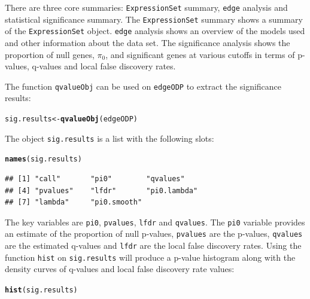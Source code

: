 \documentclass{article}\usepackage[]{graphicx}\usepackage[]{color}
\makeatletter
\newcommand{\hlstd}[1]{\textcolor[rgb]{0.345,0.345,0.345}{#1}}%
\newcommand{\hlkwb}[1]{\textcolor[rgb]{0.69,0.353,0.396}{#1}}%
\newcommand{\hlkwd}[1]{\textcolor[rgb]{0.737,0.353,0.396}{\textbf{#1}}}%
\newenvironment{kframe}{%
 \def\at@end@of@kframe{}%
 \ifinner\ifhmode%
  \def\at@end@of@kframe{\end{minipage}}%
  \begin{minipage}{\columnwidth}%
 \fi\fi%
 \def\FrameCommand##1{\hskip\@totalleftmargin \hskip-\fboxsep
 \colorbox{shadecolor}{##1}\hskip-\fboxsep
     \hskip-\linewidth \hskip-\@totalleftmargin \hskip\columnwidth}%
 \MakeFramed {\advance\hsize-\width
   \@totalleftmargin\z@ \linewidth\hsize
   \@setminipage}}%
 {\par\unskip\endMakeFramed%
 \at@end@of@kframe}
\newenvironment{knitrout}{}{} %
\makeatother
\begin{document}
There are three core summaries: {\tt ExpressionSet} summary, {\tt edge} analysis and statistical significance summary. The {\tt ExpressionSet} summary shows a summary of the {\tt ExpressionSet} object. {\tt edge} analysis shows an overview of the models used and other information about the data set. The significance analysis shows the proportion of null genes, $\pi_{0}$, and significant genes at various cutoffs in terms of p-values, q-values and local false discovery rates.

The function {\tt qvalueObj} can be used on {\tt edgeODP} to extract the significance results:
\begin{knitrout}
\color{fgcolor}\begin{kframe}
\begin{alltt}
\hlstd{sig.results} \hlkwb{<-} \hlkwd{qvalueObj}\hlstd{(edgeODP)}
\end{alltt}
\end{kframe}
\end{knitrout}

The object {\tt sig.results} is a list with the following slots:
\begin{knitrout}
\color{fgcolor}\begin{kframe}
\begin{alltt}
\hlkwd{names}\hlstd{(sig.results)}
\end{alltt}
\begin{verbatim}
## [1] "call"       "pi0"        "qvalues"   
## [4] "pvalues"    "lfdr"       "pi0.lambda"
## [7] "lambda"     "pi0.smooth"
\end{verbatim}
\end{kframe}
\end{knitrout}

The key variables are {\tt pi0}, {\tt pvalues}, {\tt lfdr} and {\tt qvalues}. The {\tt pi0} variable provides an estimate of the proportion of null p-values, {\tt pvalues} are the p-values, {\tt qvalues} are the estimated q-values and {\tt lfdr} are the local false discovery rates. Using the function {\tt hist} on {\tt sig.results} will produce a p-value histogram along with the density curves of q-values and local false discovery rate values:
\begin{knitrout}
\color{fgcolor}\begin{kframe}
\begin{alltt}
\hlkwd{hist}\hlstd{(sig.results)}
\end{alltt}
\end{kframe}
\end{knitrout}
\end{document}
